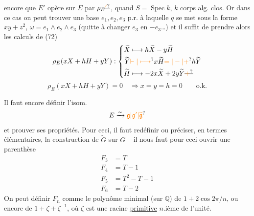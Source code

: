 encore que $E'$ opère \uline{} sur $E$ par $\rho_E\deleted{\unsure{'}}$, quand  $S=\operatorname{Spec}k$, $k$ corps alg. clos. Or dans ce cas on peut trouver une base $e_1,e_2,e_3$ p.r. à laquelle $q$ se met sous la forme $xy+z^2$, $\omega=e_1\wedge e_2\wedge e_3$ (quitte  à changer $e_3$ en $-e_3$\ldots) et il suffit de prendre alors les calculs de (72)
\[
\rho_E(xX+hH+yY):
\left\{\begin{aligned}
\widetilde X&\longmapsto h\widetilde X-y\widetilde H\\
\widetilde Y&\unsure{\vdash|\longmapsto} x\widetilde H\unsure{=|-|+}h\widetilde Y\\
\widetilde H&\longmapsto-2x\widetilde X+2y\widetilde Y\deleted{\unsure{+}}
\end{aligned}\right.
\]
\[
\rho_E(xX+hH+yY)=0\quad\Longrightarrow x=y=h=0\qquad\text{o.k.}
\]

Il faut encore définir l'isom.
\[
 E\xrightarrow{\sim}\unsure{\mathfrak g|\mathfrak g'|\widetilde{\mathfrak g}}
\]
et prouver ses propriétés. Pour ceci, il faut redéfinir ou préciser, en termes élémentaires, la construction de $\widetilde G$ sur $G$ -- il nous faut pour ceci ouvrir une parenthèse
\[
\begin{aligned}
F_3&=T\\
F_4&=T-1\\
F_5&=T^2-T-1\\
F_6&=T-2
\end{aligned}
\]
On peut définir $F_n$ comme le polynôme minimal (sur $\mathbb Q$) de $1+2\cos 2\pi/n$,  ou encore de $1+\zeta+\zeta^{-1}$, où $\zeta$ est une racine \uline{primitive} $n$.ième de l'unité.

